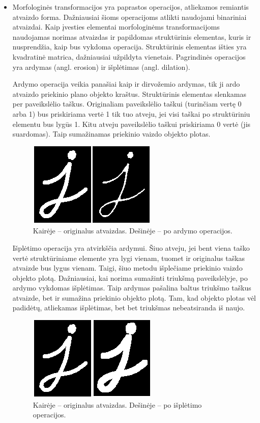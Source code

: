 \documentclass[a4paper,12pt]{article}
\begin{document}
\begin{itemize}
	\item Morfologinės transformacijos yra paprastos operacijos, atliekamos remiantis atvaizdo forma. Dažniausiai šioms operacijoms atlikti naudojami binariniai atvaizdai. Kaip įvesties elementai morfologinėms transformacijoms naudojamas norimas atvaizdas ir papildomas struktūrinis elementas, kuris ir nusprendžia, kaip bus vykdoma operacija. Struktūrinis elementas išties yra kvadratinė matrica, dažniausiai užpildyta vienetais. Pagrindinės operacijos yra ardymas (angl. erosion) ir išplėtimas (angl. dilation).
	
	Ardymo operacija veikia panašiai kaip ir dirvožemio ardymas, tik ji ardo atvaizdo priekinio plano objekto kraštus. Struktūrinis elementas slenkamas per paveikslėlio taškus. Originaliam paveikslėlio taškui (turinčiam vertę 0 arba 1) bus priskiriama vertė 1 tik tuo atveju, jei visi taškai po struktūriniu elementu bus lygūs 1. Kitu atveju paveikslėlio taškui priskiriama 0 vertė (jis suardomas). Taip sumažinamas priekinio vaizdo objekto plotas.
			\begin{figure}[H]
				\centering
				\includegraphics[scale=0.5]{images/erosion1}
				\caption{Kairėje – originalus atvaizdas. Dešinėje – po ardymo operacijos.}   %
				\label{img:erosion1}
			\end{figure} 
	
	Išplėtimo operacija yra atvirkščia ardymui. Šiuo atveju, jei bent viena taško vertė struktūriniame elemente yra lygi vienam, tuomet ir originalus taškas atvaizde bus lygus vienam. Taigi, šiuo metodu išplečiame priekinio vaizdo objekto plotą. Dažniausiai, kai norima sumažinti triukšmą paveikslėlyje, po ardymo vykdomas išplėtimas. Taip ardymas pašalina baltus triukšmo taškus atvaizde, bet ir sumažina priekinio objekto plotą. Tam, kad objekto plotas vėl padidėtų, atliekamas išplėtimas, bet bet triukšmas nebeatsiranda iš naujo.
				\begin{figure}[H]
					\centering
					\includegraphics[scale=0.4]{images/dilation}
					\caption{Kairėje – originalus atvaizdas. Dešinėje – po išplėtimo operacijos.}   %
					\label{img:dilation}
				\end{figure} 
				

\end{itemize}
\end{document}
